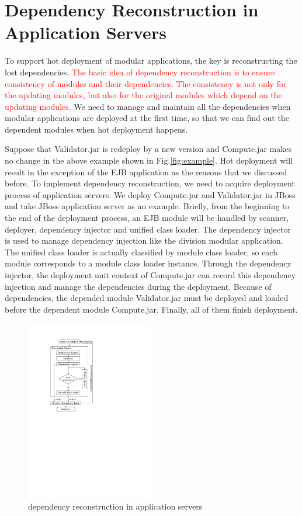 \documentclass[conference]{IEEEtran}
\begin{document}
\section{Dependency Reconstruction in Application Servers\label{sec:reconstructionAS}}

To support hot deployment of modular applications, the key is reconstructing the lost dependencies.
\textcolor{red}{The basic idea of dependency reconstruction is to ensure consistency of modules and their dependencies.
The consistency is not only for the updating modules, but also for the original modules which depend on the updating modules.}
We need to manage and maintain all the dependencies when modular applications are deployed at the first time, so that we can find out the dependent modules when hot deployment happens.

Suppose that Validator.jar is redeploy by a new version and Compute.jar makes no change in the above example shown in Fig.\ref{fig:example}. 
Hot deployment will result in the exception of the EJB application as the reasons that we discussed before.
To implement dependency reconstruction, we need to acquire deployment process of application servers.
We deploy Compute.jar and Validator.jar in JBoss and take JBoss application server as an example.
Briefly, from the beginning to the end of the deployment process, an EJB module will be handled by scanner, deployer, dependency injector and unified class loader\cite{deployment_process}.
The dependency injector is used to manage dependency injection like the division modular application.
The unified class loader is actually classified by module class loader, so each module corresponds to a module class loader instance. 
Through the dependency injector, the deployment unit context of Compute.jar can record this dependency injection and manage the dependencies during the deployment. 
Because of dependencies, the depended module Validator.jar must be deployed and loaded before the dependent module Compute.jar. 
Finally, all of them finish deployment.

\begin{figure}[ht]
\centering
\includegraphics[width=2.2in]{ProcessReconstructionAS.pdf}
\caption{dependency reconstruction in application servers}
\label{fig:reconstruction_AS}
\end{figure}
\end{document}
